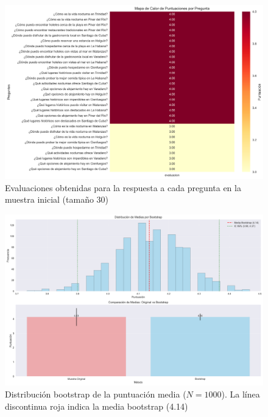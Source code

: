 \documentclass[10pt]{llncs}
\begin{document}
\begin{figure}
\centering
\includegraphics[width=1\textwidth]{../src/experiments/one_only_agent/quality_heatmap_20250617-171514.png}
\caption{Evaluaciones obtenidas para la respuesta a cada pregunta en la muestra inicial (tamaño 30)}
\label{fig:eval_1}
\end{figure}

\begin{figure}
\centering
\includegraphics[width=1\textwidth]{../src/experiments/specialized_agents/bootstrap_distribution_20250617-171856.png}
\caption{Distribución bootstrap de la puntuación media ($N=1000$). La línea discontinua roja indica la media bootstrap (4.14)}
\label{fig:boot_dist_2}
\end{figure}
\end{document}
